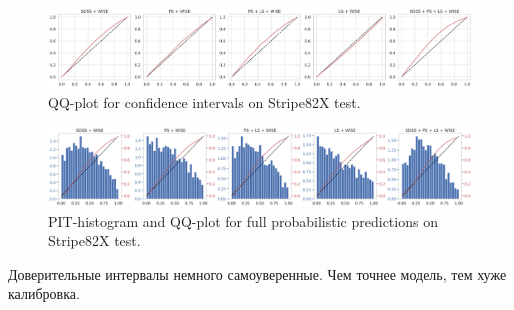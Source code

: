\begin{figure}
    \centering
    \includegraphics[width=\linewidth]{images/calibration-ci.png}
    \caption{QQ-plot for confidence intervals on Stripe82X test.}
    \label{fig:qqci}
\end{figure}


\begin{figure}
    \centering
    \includegraphics[width=\linewidth]{images/calibration-pit.png}
    \caption{PIT-histogram and QQ-plot for full probabilistic predictions on Stripe82X test.}
    \label{fig:qqpit}
\end{figure}

Доверительные интервалы немного самоуверенные. Чем точнее модель, тем хуже калибровка.
